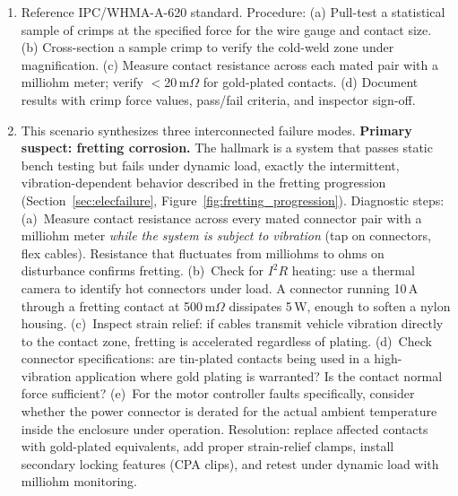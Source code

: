 \documentclass[11pt,letterpaper,twoside,openany]{book}
\begin{document}
\begin{enumerate}[leftmargin=1.5em]
  \item Reference IPC/WHMA-A-620 standard. Procedure: (a) Pull-test a statistical sample of crimps at the specified force for the wire gauge and contact size. (b) Cross-section a sample crimp to verify the cold-weld zone under magnification. (c) Measure contact resistance across each mated pair with a milliohm meter; verify $<$20\,m$\Omega$ for gold-plated contacts. (d) Document results with crimp force values, pass/fail criteria, and inspector sign-off.

  \item This scenario synthesizes three interconnected failure modes. \textbf{Primary suspect: fretting corrosion.} The hallmark is a system that passes static bench testing but fails under dynamic load, exactly the intermittent, vibration-dependent behavior described in the fretting progression (Section~\ref{sec:elecfailure}, Figure~\ref{fig:fretting_progression}). Diagnostic steps: (a)~Measure contact resistance across every mated connector pair with a milliohm meter \emph{while the system is subject to vibration} (tap on connectors, flex cables). Resistance that fluctuates from milliohms to ohms on disturbance confirms fretting. (b)~Check for $I^2R$ heating: use a thermal camera to identify hot connectors under load. A connector running 10\,A through a fretting contact at 500\,m$\Omega$ dissipates 5\,W, enough to soften a nylon housing. (c)~Inspect strain relief: if cables transmit vehicle vibration directly to the contact zone, fretting is accelerated regardless of plating. (d)~Check connector specifications: are tin-plated contacts being used in a high-vibration application where gold plating is warranted? Is the contact normal force sufficient? (e)~For the motor controller faults specifically, consider whether the power connector is derated for the actual ambient temperature inside the enclosure under operation. Resolution: replace affected contacts with gold-plated equivalents, add proper strain-relief clamps, install secondary locking features (CPA clips), and retest under dynamic load with milliohm monitoring.
\end{enumerate}


\end{document}
